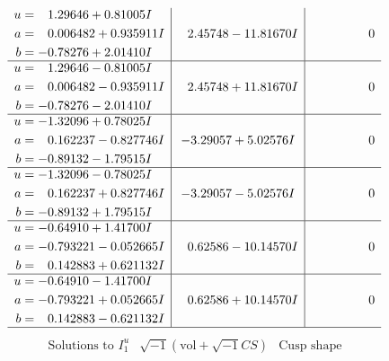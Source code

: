\documentclass[1p]{elsarticle_modified}
\theoremstyle{definition}
\newcommand{\I}{\sqrt{-1}}
\begin{document}
$$\begin{array}{c|c|c}
\begin{aligned}
u &= \phantom{-}1.29646 + 0.81005 I \\
a &= \phantom{-}0.006482 + 0.935911 I \\
b &= -0.78276 + 2.01410 I\end{aligned}
 & \phantom{-}2.45748 - 11.81670 I & \phantom{-0.000000 } 0 \\ \hline\begin{aligned}
u &= \phantom{-}1.29646 - 0.81005 I \\
a &= \phantom{-}0.006482 - 0.935911 I \\
b &= -0.78276 - 2.01410 I\end{aligned}
 & \phantom{-}2.45748 + 11.81670 I & \phantom{-0.000000 } 0 \\ \hline\begin{aligned}
u &= -1.32096 + 0.78025 I \\
a &= \phantom{-}0.162237 - 0.827746 I \\
b &= -0.89132 - 1.79515 I\end{aligned}
 & -3.29057 + 5.02576 I & \phantom{-0.000000 } 0 \\ \hline\begin{aligned}
u &= -1.32096 - 0.78025 I \\
a &= \phantom{-}0.162237 + 0.827746 I \\
b &= -0.89132 + 1.79515 I\end{aligned}
 & -3.29057 - 5.02576 I & \phantom{-0.000000 } 0 \\ \hline\begin{aligned}
u &= -0.64910 + 1.41700 I \\
a &= -0.793221 - 0.052665 I \\
b &= \phantom{-}0.142883 + 0.621132 I\end{aligned}
 & \phantom{-}0.62586 - 10.14570 I & \phantom{-0.000000 } 0 \\ \hline\begin{aligned}
u &= -0.64910 - 1.41700 I \\
a &= -0.793221 + 0.052665 I \\
b &= \phantom{-}0.142883 - 0.621132 I\end{aligned}
 & \phantom{-}0.62586 + 10.14570 I & \phantom{-0.000000 } 0\\
 \hline 
 \end{array}$$\newpage$$\begin{array}{c|c|c}  
\text{Solutions to }I^u_{1}& \I (\text{vol} + \sqrt{-1}CS) & \text{Cusp shape}\\
 \hline 
\begin{aligned}

\end{aligned}
\end{array}$$
\end{document}
